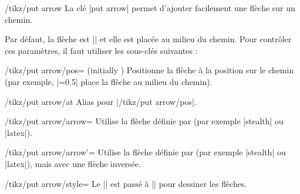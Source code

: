 \documentclass[a4paper]{ltxdoc}
\begin{document}
\begin{key}{/tikz/put arrow}
La clé |put arrow| permet d'ajouter facilement une flèche sur un chemin.

\begin{codeexample}[width=6cm]
\end{codeexample}

Par défaut, la flèche est |\arrow{>}| et elle est placée au milieu du chemin.
Pour contrôler ces paramètres, il faut utiliser les sous-clés suivantes :

\begin{key}{/tikz/put arrow/pos= (initially )}
  Positionne la flèche à la position  sur le chemin (par exemple, |=0.5| place la flèche au milieu du chemin).
\end{key}

\begin{key}{/tikz/put arrow/at}
  Alias pour |/tikz/put arrow/pos|.
\end{key}

\begin{key}{/tikz/put arrow/arrow=}
  Utilise la flèche définie par  (par exemple |stealth| ou |latex|).
\end{key}

\begin{key}{/tikz/put arrow/arrow'=}
  Utilise la flèche définie par  (par exemple |stealth| ou |latex|), mais avec une flèche inversée.
\end{key}

\begin{codeexample}[width=6cm]
\end{codeexample}

\begin{key}{/tikz/put arrow/style=}
  Le || est passé à || pour dessiner les flèches.
\end{key}

\begin{codeexample}[width=5cm]
\end{codeexample}


\end{key}
\end{document}
